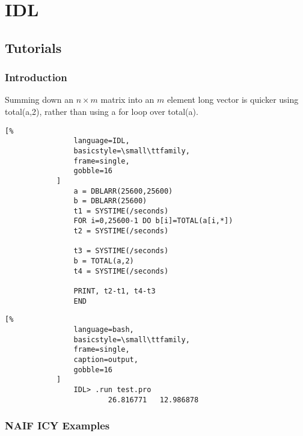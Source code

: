\documentclass[crop=false,class=book]{standalone}
\begin{document}
\chapter{IDL}
    \section{Tutorials}
    \subsection{Introduction}
        Summing down an $n\times{m}$ matrix into an $m$ element
        long vector is quicker using total(a,2), rather than using
        a for loop over total(a).
        \newline
        \begin{minipage}[t]{.48\textwidth}
            \centering
            \begin{lstlisting}[%
                language=IDL,
                basicstyle=\small\ttfamily,
                frame=single,
                gobble=16
            ]
                a = DBLARR(25600,25600)
                b = DBLARR(25600)
                t1 = SYSTIME(/seconds)
                FOR i=0,25600-1 DO b[i]=TOTAL(a[i,*])
                t2 = SYSTIME(/seconds)

                t3 = SYSTIME(/seconds)
                b = TOTAL(a,2)
                t4 = SYSTIME(/seconds)

                PRINT, t2-t1, t4-t3
                END
            \end{lstlisting}
        \end{minipage}\hfill
        \begin{minipage}[t]{.48\textwidth}
            \centering
            \begin{lstlisting}[%
                language=bash,
                basicstyle=\small\ttfamily,
                frame=single,
                caption=output,
                gobble=16
            ]
                IDL> .run test.pro
                        26.816771   12.986878
            \end{lstlisting}
        \end{minipage}
    \subsection{NAIF ICY Examples}
\end{document}
